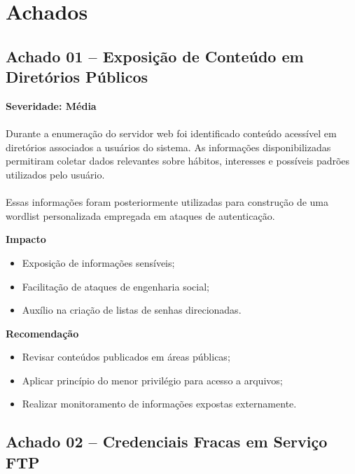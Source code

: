 \section{Achados}

\subsection{Achado 01 -- Exposição de Conteúdo em Diretórios Públicos}

\textbf{Severidade: Média}

\paragraph{}
Durante a enumeração do servidor web foi identificado conteúdo acessível em
diretórios associados a usuários do sistema. As informações disponibilizadas
permitiram coletar dados relevantes sobre hábitos, interesses e possíveis
padrões utilizados pelo usuário.

\paragraph{}
Essas informações foram posteriormente utilizadas para construção de uma
wordlist personalizada empregada em ataques de autenticação.

\textbf{Impacto}

\begin{itemize}
  \item Exposição de informações sensíveis;
  \item Facilitação de ataques de engenharia social;
  \item Auxílio na criação de listas de senhas direcionadas.
\end{itemize}

\textbf{Recomendação}

\begin{itemize}
  \item Revisar conteúdos publicados em áreas públicas;
  \item Aplicar princípio do menor privilégio para acesso a arquivos;
  \item Realizar monitoramento de informações expostas externamente.
\end{itemize}

\subsection{Achado 02 -- Credenciais Fracas em Serviço FTP}

